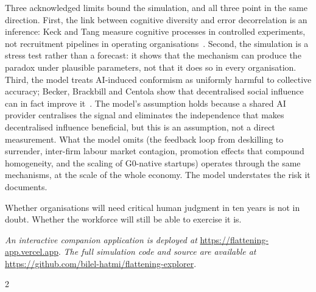 \documentclass[11pt,a4paper]{article}
\begin{document}
Three acknowledged limits bound the simulation, and all three point in the same
direction. First, the link between cognitive diversity and error decorrelation is
an inference: Keck and Tang measure cognitive processes in controlled experiments,
not recruitment pipelines in operating organisations~\cite{keck_psychsci_2020}.
Second, the simulation is a stress test rather than a forecast: it shows that the
mechanism can produce the paradox under plausible parameters, not that it does so
in every organisation. Third, the model treats AI-induced conformism as uniformly
harmful to collective accuracy; Becker, Brackbill and Centola show that
decentralised social influence can in fact improve it~\cite{becker_pnas_2017}.
The model's assumption holds because a shared AI provider centralises the signal
and eliminates the independence that makes decentralised influence beneficial,
but this is an assumption, not a direct measurement. What the model omits (the
feedback loop from deskilling to surrender, inter-firm labour market contagion,
promotion effects that compound homogeneity, and the scaling of G0-native
startups) operates through the same mechanisms, at the scale of the whole
economy. The model understates the risk it documents.

Whether organisations will need critical human judgment in ten years is not in
doubt. Whether the workforce will still be able to exercise it is.

\bigskip
\noindent\textit{An interactive companion application is deployed at}
\url{https://flattening-app.vercel.app}.
\textit{The full simulation code and source are available at}
\url{https://github.com/bilel-hatmi/flattening-explorer}.

\clearpage
{}
\setlength{\bibsep}{1pt plus 0.3ex}

\begin{multicols}{2}
{\scriptsize

}
\end{multicols}
\restoregeometry
\end{document}
